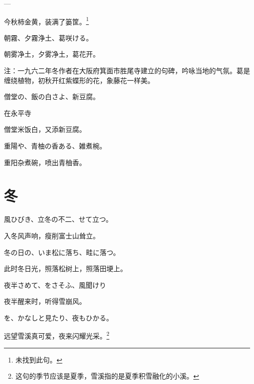 \begin{haiku}
    {\FH ---}

    {\FK 今秋柿金黄，装满了篓筐。\footnote{\FT 未找到此句。}}
\end{haiku}

\begin{haiku}
    {\FH 朝霧、夕霧浄土、葛咲ける。}

    {\FK 朝雾净土，夕雾净土，葛花开。}

    {\FT 注：一九六二年冬作者在大阪府箕面市胜尾寺建立的句碑，吟咏当地的气氛。葛是缠绕植物，初秋开红紫蝶形的花，象藤花一样美。}
\end{haiku}

\begin{haiku}
    {\FH 僧堂の、飯の白さよ、新豆腐。}

    {\FK 在永平寺}

    {\FK 僧堂米饭白，又添新豆腐。}
\end{haiku}

\begin{haiku}
    {\FH 重陽や、青柚の香ある、雑煮椀。}

    {\FK 重阳杂煮碗，喷出青柚香。}
\end{haiku}

\section{\FK 冬}

\setcounter{haikucounter}{0}

\begin{haiku}
    {\FH 風ひびき、立冬の不二、せて立つ。}

    {\FK 入冬风声响，瘦削富士山耸立。}
\end{haiku}

\begin{haiku}
    {\FH 冬の日の、いま松に落ち、畦に落つ。}

    {\FK 此时冬日光，照落松树上，照落田埂上。}
\end{haiku}

\begin{haiku}
    {\FH 夜半さめて、をさそふ、風聞けり}

    {\FK 夜半醒来时，听得雪崩风。}
\end{haiku}

\begin{haiku}
    {\FH {}を、かなしと見たり、夜もひかる。}

    {\FK 远望雪溪真可爱，夜来闪耀光采。\footnote{\FT 这句的季节应该是夏季，雪溪指的是夏季积雪融化的小溪。}}
\end{haiku}


